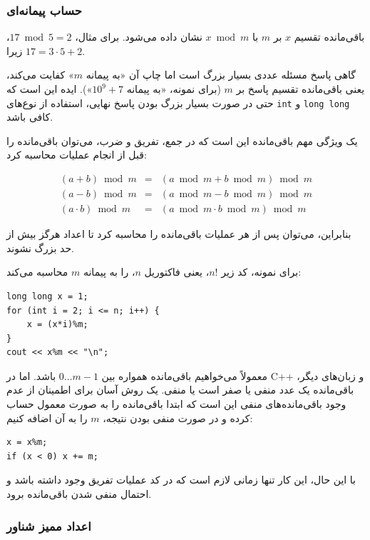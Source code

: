 \subsubsection{حساب پیمانه‌ای}


باقی‌مانده تقسیم $x$ بر $m$ با $x \bmod m$ نشان داده می‌شود.
برای مثال، $17 \bmod 5 = 2$، زیرا $17 = 3 \cdot 5 + 2$.

گاهی پاسخ مسئله عددی بسیار بزرگ است اما چاپ آن «به پیمانه $m$» کفایت می‌کند، یعنی باقی‌مانده تقسیم پاسخ بر $m$ (برای نمونه، «به پیمانه $10^9+7$»).
ایده این است که حتی در صورت بسیار بزرگ بودن پاسخ نهایی، استفاده از نوع‌های \texttt{int} و \texttt{long long} کافی باشد.

یک ویژگی مهم باقی‌مانده این است که
در جمع، تفریق و ضرب،
می‌توان باقی‌مانده را قبل از انجام عملیات محاسبه کرد:

\[
\begin{array}{rcr}
(a+b) \bmod m & = & (a \bmod m + b \bmod m) \bmod m \\
(a-b) \bmod m & = & (a \bmod m - b \bmod m) \bmod m \\
(a \cdot b) \bmod m & = & (a \bmod m \cdot b \bmod m) \bmod m
\end{array}
\]

بنابراین، می‌توان پس از هر عملیات باقی‌مانده را محاسبه کرد
تا اعداد هرگز بیش از حد بزرگ نشوند.

برای نمونه، کد زیر $n!$،
یعنی فاکتوریل $n$، را به پیمانه $m$ محاسبه می‌کند:
\begin{lstlisting}
long long x = 1;
for (int i = 2; i <= n; i++) {
    x = (x*i)%m;
}
cout << x%m << "\n";
\end{lstlisting}

معمولاً می‌خواهیم باقی‌مانده همواره
بین $0\ldots m-1$ باشد.
اما در C++ و زبان‌های دیگر،
باقی‌مانده یک عدد منفی
یا صفر است یا منفی.
یک روش آسان برای اطمینان از عدم وجود
باقی‌مانده‌های منفی این است که ابتدا باقی‌مانده را
به صورت معمول حساب کرده و در صورت منفی بودن نتیجه،
$m$ را به آن اضافه کنیم:
\begin{lstlisting}
x = x%m;
if (x < 0) x += m;
\end{lstlisting}
با این حال، این کار تنها زمانی لازم است که
در کد عملیات تفریق وجود داشته باشد و
احتمال منفی شدن باقی‌مانده برود.

\subsubsection{اعداد ممیز شناور}

